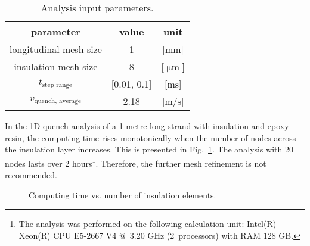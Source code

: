 \begin{table}[H]
    \caption{Analysis input parameters.} 
    \vspace{-1.em} 
    \fontsize{10}{10}
    \selectfont 
    \renewcommand{\arraystretch}{1.5}
    \begin{center}
        \begin{tabular}{ ccc }  
        \hline
        parameter & value & unit \\
        \hline
        longitudinal mesh size & 1 & [mm] \\
        insulation mesh size & 8 & [$\upmu \text{m}$] \\
        $t_\text{step range}$ & [0.01, 0.1] & [ms] \\
        $v_\text{quench, average}$ & 2.18 & [m/s] \\
        \hline 
        \end{tabular}
    \end{center}  
     \label{table: 1d_qv_benchmarking_reference_analysis_settings_with_insulation} 
 \end{table}

In the 1D quench analysis of a 1 metre-long strand with insulation and epoxy resin, the computing time rises monotonically when the number of nodes across the insulation layer increases. This is presented in Fig.~\ref{fig: q_vel_modelling_heat_balance_computing_time_with_insulation}. The analysis with 20 nodes lasts over 2 hours\footnote{The analysis was performed on the following calculation unit: Intel(R) Xeon(R) CPU E5-2667 V4 @~3.20 GHz (2~processors) with RAM 128 GB.}. Therefore, the further mesh refinement is not recommended.

\begin{figure}[H]
\centering
    \caption{Computing time vs. number of insulation elements.}
    \label{fig: q_vel_modelling_heat_balance_computing_time_with_insulation}
\end{figure}
